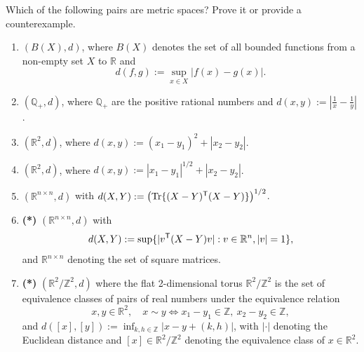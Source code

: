 \begin{exercise}
\label{ex:metric_space_examples}
Which of the following pairs are metric spaces? Prove it or provide a counterexample.
\begin{enumerate}[label=\textbf{(\alph*)}]
  \item $(B(X), d)$, where $B(X)$ denotes the set of all bounded functions from a non-empty set
    $X$ to $\mathbb{R}$ and
    $$d(f,g) := \sup_{x \in X} |f(x) - g(x)|.$$
  \item $(\mathbb{Q}_+, d)$, where $\mathbb{Q}_+$ are the positive rational numbers and
    $d(x,y) := \left|\tfrac{1}{x} - \tfrac{1}{y}\right|$.
  \item $(\mathbb{R}^2, d)$, where $d(x,y) := (x_1 - y_1)^2 + |x_2 - y_2|$.
  \item $(\mathbb{R}^2, d)$, where $d(x,y) := |x_1 - y_1|^{1/2} + |x_2 - y_2|$.
  \item $(\mathbb{R}^{n \times n}, d)$ with
    $d(X,Y) := \left(\operatorname{Tr}\{(X-Y)^{\mathsf{T}}(X-Y)\}\right)^{1/2}$.
  \item \textbf{(*)} $(\mathbb{R}^{n \times n}, d)$ with
    $$d(X,Y) := \sup\{|v^{\mathsf{T}}(X-Y)v| : v \in \mathbb{R}^n, |v| = 1\},$$
    and $\mathbb{R}^{n\times n}$ denoting the set of square matrices.
  \item \textbf{(*)} $(\mathbb{R}^2/\mathbb{Z}^2, d)$ where the flat 2-dimensional torus
    $\mathbb{R}^2/\mathbb{Z}^2$ is the set of equivalence classes of pairs of real numbers under
    the equivalence relation
    $$x, y \in \mathbb{R}^2, \quad x \sim y \iff x_1 - y_1 \in \mathbb{Z},\ x_2 - y_2 \in \mathbb{Z},$$
    and $d([x],[y]) := \inf_{k,h \in \mathbb{Z}} |x - y + (k,h)|$, with $|\cdot|$ denoting the
    Euclidean distance and $[x] \in \mathbb{R}^2/\mathbb{Z}^2$ denoting the equivalence class of
    $x \in \mathbb{R}^2$.
\end{enumerate}

\end{exercise}

